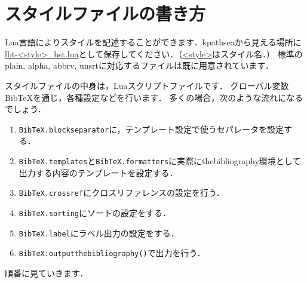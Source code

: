 \documentclass[a4paper]{ltjsarticle}
\newcommand{\luafunc}[1]{\texttt{#1}}
\newcommand*{\luavar}[1]{\texttt{#1}}
\begin{document}
\section{スタイルファイルの書き方}
Lua言語によりスタイルを記述することができます．kpathseaから見える場所に\url{lbt-<style>_bst.lua}として保存してください．（\url{<style>}はスタイル名．）
標準のplain, alpha, abbrv, unsrtに対応するファイルは既に用意されています．

スタイルファイルの中身は，Luaスクリプトファイルです．
グローバル変数BibTeXを通じ，各種設定などを行います．
多くの場合，次のような流れになるでしょう．
\begin{enumerate}
\item \luavar{BibTeX.blockseparator}に，テンプレート設定で使うセパレータを設定する．
\item \luavar{BibTeX.templates}と\luavar{BibTeX.formatters}に実際にthebibliography環境として出力する内容のテンプレートを設定する．
\item \luavar{BibTeX.crossref}にクロスリファレンスの設定を行う．
\item \luavar{BibTeX.sorting}にソートの設定をする．
\item \luavar{BibTeX.label}にラベル出力の設定をする．
\item \luafunc{BibTeX:outputthebibliography()}で出力を行う．
\end{enumerate}
順番に見ていきます．


%
%
%
%
%
%
\end{document}
